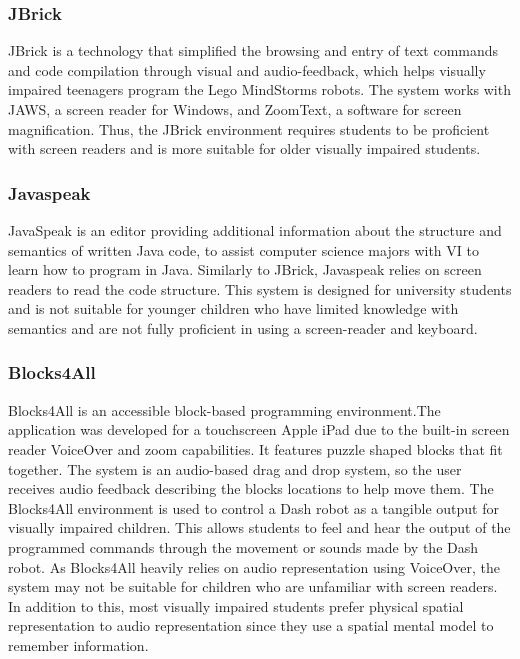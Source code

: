 \documentclass[oneside,%
                    author={Malak Hajji},
                    degree={BSc},
                    title={Designing An Accessible Ozobot Programming Platform for Students},
                  subtitle={With Mixed Visual Abilities}]{dissertation}
\begin{document}
\subsubsection{JBrick}
JBrick\cite{jbrick} is a technology that simplified the browsing and entry of text commands and code compilation through visual and audio-feedback, which helps visually impaired teenagers program the Lego MindStorms robots. The system works with JAWS, a screen reader for Windows, and ZoomText, a software for screen magnification. Thus, the JBrick environment requires students to be proficient with screen readers and is more suitable for older visually impaired students.

\subsubsection{Javaspeak}
JavaSpeak\cite{javaspeak} is an editor providing additional information about the structure and semantics of written Java code, to assist computer science majors with VI to learn how to program in Java. Similarly to JBrick\cite{jbrick}, Javaspeak  relies on screen readers to read the code structure. This system is designed for university students and is not suitable for younger children who have limited knowledge with semantics and are not fully proficient in using a screen-reader and keyboard.

\subsubsection{Blocks4All}
Blocks4All is an accessible block-based programming environment\cite{blocksforall}.The application was developed for a touchscreen Apple iPad due to the built-in screen reader VoiceOver and zoom capabilities. It features puzzle shaped blocks that fit together. The system is an audio-based drag and drop system, so the user receives audio feedback describing the blocks locations to help move them. The Blocks4All environment is used to control a Dash robot as a tangible output for visually impaired children. This allows students to feel and hear the output of the programmed commands through the movement or sounds made by the Dash robot. As Blocks4All heavily relies on audio representation using VoiceOver, the system may not be suitable for children who are unfamiliar with screen readers. In addition to this, most visually impaired students prefer  physical spatial representation to audio representation since they use a spatial mental model to remember information.
\end{document}
